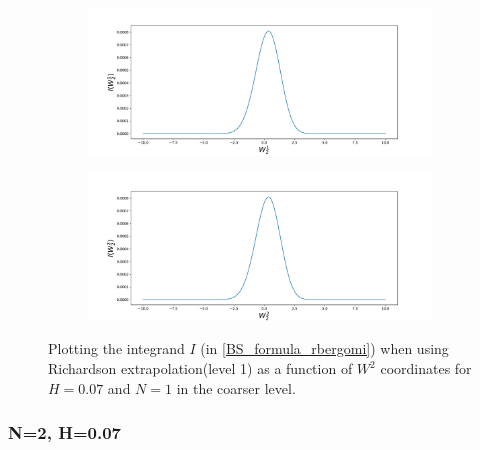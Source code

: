 \documentclass[11pt]{article}
\begin{document}
\begin{figure}[h!]
	\centering
	\begin{subfigure}{.4\textwidth}
		\centering
		\includegraphics[width=1\linewidth]{./figures/integrand_richardson_plotting_rBergomi/N_1/W_2/Bergomi_integrand_rich_level1_K_1_H_007_y3f_N_1}
		\caption{}
		\label{fig:sub3}
	\end{subfigure}%
	\begin{subfigure}{.4\textwidth}
		\centering
		\includegraphics[width=1\linewidth]{./figures/integrand_richardson_plotting_rBergomi/N_1/W_2/Bergomi_integrand_rich_level1_K_1_H_007_y4f_N_1}
		\caption{}
		\label{fig:sub4}
	\end{subfigure}
	\caption{Plotting the integrand $I$ (in \eqref{BS_formula_rbergomi}) when using Richardson extrapolation(level 1) as a function of $W^2$ coordinates for $H=0.07$ and $N=1$ in the coarser level.}
	\label{fig:Integrand_rich_level1_H_007_N_1_W_2}
\end{figure}


\newpage
\subsubsection*{N=2, H=0.07}
\end{document}
